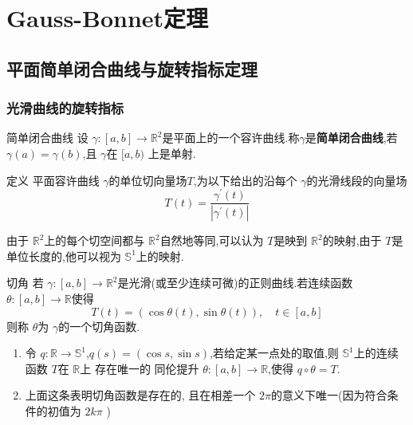 \documentclass[../../main.tex]{subfiles}
\begin{document}
\chapter{Gauss-Bonnet定理}


\section{平面简单闭合曲线与旋转指标定理}
\subsection{光滑曲线的旋转指标}
\begin{definition}{简单闭合曲线}
    设 \(   \gamma   :\left[ a,b \right]\to \mathbb{R} ^{2} \)是平面上的一个容许曲线.称\(   \gamma   \)是\textbf{简单闭合曲线},若 \(   \gamma \left( a \right)=  \gamma \left( b \right)    \),且 \(   \gamma   \)在 \(  [a,b)  \)     上是单射.
\end{definition}

\begin{definition}
    定义 平面容许曲线 \(   \gamma   \)的单位切向量场\(  T  \),为以下给出的沿每个 \(   \gamma   \)的光滑线段的向量场  \[
    T\left( t \right)= \frac{ \gamma ^{\prime} \left( t \right)  }{\left|  \gamma ^{\prime} \left( t \right)  \right|  }  
    \]  
\end{definition}

\begin{remark}
    由于 \(  \mathbb{R} ^{2}  \)上的每个切空间都与 \(  \mathbb{R} ^{2}  \)自然地等同,可以认为 \(  T  \)是映到 \(  \mathbb{R} ^{2}  \)的映射,由于 \(  T  \)是单位长度的,他可以视为 \(  \mathbb{S}^{1}  \)上的映射.      
\end{remark}


\begin{definition}{切角}
    若 \(   \gamma :\left[ a,b \right]\to \mathbb{R} ^{2}   \)是光滑(或至少连续可微)的正则曲线.若连续函数 \(   \theta :\left[ a,b \right]\to \mathbb{R}    \)使得 \[
    T\left( t \right)= \left( \cos  \theta \left( t \right),\sin  \theta \left( t \right)   \right),\quad t\in \left[ a,b \right]   
    \]  则称 \(   \theta   \)为 \(   \gamma   \)的一个切角函数.  
\end{definition}

\begin{remark}
    \begin{enumerate}
        \item 令 \(  q:\mathbb{R} \to \mathbb{S}^{1}  \),\(  q\left( s \right)= \left( \cos s,\sin s \right)    \),若给定某一点处的取值,则 \(  \mathbb{S}^{1}  \)上的连续函数 \(  T  \)在 \(  \mathbb{R}   \)上  存在唯一的   同伦提升 \(   \theta :\left[ a,b \right]\to \mathbb{R}    \),使得 \(  q\circ  \theta = T  \).
        \item 上面这条表明切角函数是存在的,  且在相差一个 \(  2\pi   \)的意义下唯一(因为符合条件的初值为 \(  2k\pi   \) ) 
    \end{enumerate}
    
\end{remark}
\end{document}
